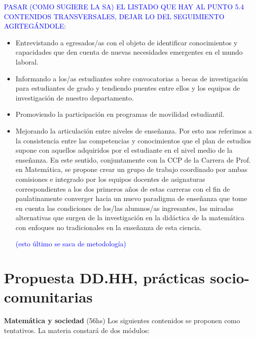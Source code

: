 \documentclass[a4paper, 12pt]{article}
\begin{document}
\textcolor{blue}{ PASAR (COMO SUGIERE LA SA) EL LISTADO QUE HAY AL PUNTO 5.4 CONTENIDOS TRANSVERSALES, DEJAR LO DEL SEGUIMIENTO AGRTEGÁNDOLE}:

\begin{itemize}

\item Entrevistando a egresados/as con el objeto de identificar conocimientos  y capacidades que den cuenta de nuevas  necesidades  emergentes en el mundo laboral.

\item Informando a los/as  estudiantes sobre convocatorias a becas de investigación para estudiantes de grado y tendiendo puentes entre ellos y los equipos de investigación de nuestro departamento. 

\item Promoviendo la participación en programas de movilidad estudiantil. 

\item Mejorando la articulación entre niveles de enseñanza. Por esto nos referimos a la consistencia entre  las competencias y conocimientos que el plan de estudios supone con aquellos   adquiridos por el estudiante en el  nivel medio de  la enseñanza. En este sentido, conjuntamente con la CCP de la Carrera de Prof. en Matemática, se propone crear un grupo de trabajo coordinado por ambas comisiones e integrado por los equipos docentes de asignaturas correspondientes a los dos primeros años de estas carreras con el fin de paulatinamente converger hacia un nuevo paradigma de enseñanza que tome en cuenta las condiciones de los/las alumnos/as ingresantes, las  miradas alternativas que surgen de la investigación en la didáctica de la matemática con enfoques no tradicionales en la enseñanza  de esta ciencia. 

\textcolor{blue}{(esto último se saca de  metodología)}

\end{itemize}


\section*{Propuesta DD.HH, prácticas socio-comunitarias}

 


\noindent\textbf{Matemática y sociedad} (56hs) Los siguientes contenidos se proponen como tentativos. La materia constará de dos módulos:
\end{document}

